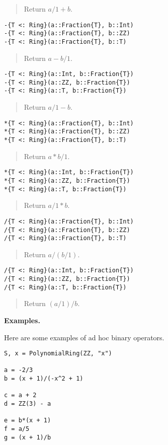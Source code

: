 \documentclass[a4paper,10pt]{article}
\newcommand{\desc}[1]{\vspace{-3mm}\begin{quote}#1\end{quote}}
\begin{document}
{{{\desc{Return $a/1 + b$.}

\begin{lstlisting}
-{T <: Ring}(a::Fraction{T}, b::Int)
-{T <: Ring}(a::Fraction{T}, b::ZZ)
-{T <: Ring}(a::Fraction{T}, b::T)
\end{lstlisting}

\desc{Return $a - b/1$.}

\begin{lstlisting}
-{T <: Ring}(a::Int, b::Fraction{T})
-{T <: Ring}(a::ZZ, b::Fraction{T})
-{T <: Ring}(a::T, b::Fraction{T})
\end{lstlisting}

\desc{Return $a/1 - b$.}

\begin{lstlisting}
*{T <: Ring}(a::Fraction{T}, b::Int)
*{T <: Ring}(a::Fraction{T}, b::ZZ)
*{T <: Ring}(a::Fraction{T}, b::T)
\end{lstlisting}

\desc{Return $a * b/1$.}

\begin{lstlisting}
*{T <: Ring}(a::Int, b::Fraction{T})
*{T <: Ring}(a::ZZ, b::Fraction{T})
*{T <: Ring}(a::T, b::Fraction{T})
\end{lstlisting}

\desc{Return $a/1 * b$.}

\begin{lstlisting}
/{T <: Ring}(a::Fraction{T}, b::Int)
/{T <: Ring}(a::Fraction{T}, b::ZZ)
/{T <: Ring}(a::Fraction{T}, b::T)
\end{lstlisting}

\desc{Return $a / (b/1)$.}

\begin{lstlisting}
/{T <: Ring}(a::Int, b::Fraction{T})
/{T <: Ring}(a::ZZ, b::Fraction{T})
/{T <: Ring}(a::T, b::Fraction{T})
\end{lstlisting}

\desc{Return $(a/1) / b$.}

\textbf{Examples.}

Here are some examples of ad hoc binary operators.

\begin{lstlisting}
S, x = PolynomialRing(ZZ, "x")

a = -2/3
b = (x + 1)/(-x^2 + 1)

c = a + 2
d = ZZ(3) - a

e = b*(x + 1)
f = a/5
g = (x + 1)/b
\end{lstlisting}

}}}
\end{document}
